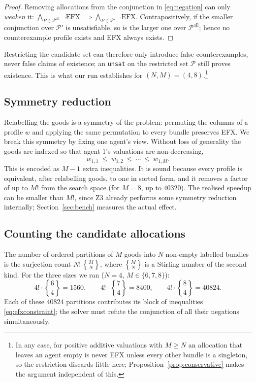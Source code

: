 \documentclass[11pt,a4paper]{article}
\theoremstyle{definition}
\theoremstyle{plain}
\newcommand{\EFX}{\textsf{EFX}}
\newcommand{\agents}{N}
\newcommand{\goods}{M}
\begin{document}
\begin{proof}
Removing allocations from the conjunction in \eqref{eq:negation} can only
\emph{weaken} it: $\bigwedge_{P\in\mathcal{P}^{\mathrm{all}}}\neg\mathrm{EFX}
\implies \bigwedge_{P\in\mathcal{P}'}\neg\mathrm{EFX}$. Contrapositively, if the
smaller conjunction over $\mathcal{P}'$ is unsatisfiable, so is the larger one
over $\mathcal{P}^{\mathrm{all}}$; hence no counterexample profile exists and
\EFX{} always exists.
\end{proof}

Restricting the candidate set can therefore only introduce false counterexamples,
never false claims of existence; an \texttt{unsat} on the restricted set
$\mathcal{P}$ still proves existence. This is what our run establishes for
$(\agents,\goods)=(4,8)$.\footnote{In any case, for positive additive valuations
with $\goods\geq\agents$ an allocation that leaves an agent empty is never \EFX{}
unless every other bundle is a singleton, so the restriction discards little here;
Proposition~\ref{prop:conservative} makes the argument independent of this.}

\subsection{Symmetry reduction}
\label{sec:symmetry}

Relabelling the goods is a symmetry of the problem: permuting the columns of a
profile $w$ and applying the same permutation to every bundle preserves \EFX. We
break this symmetry by fixing one agent's view. Without loss of generality the
goods are indexed so that agent $1$'s valuations are non-decreasing,
\[
  w_{1,1}\ \leq\ w_{1,2}\ \leq\ \cdots\ \leq\ w_{1,\goods}.
\]
This is encoded as $\goods-1$ extra inequalities. It is sound because every
profile is equivalent, after relabelling goods, to one in sorted form, and it
removes a factor of up to $\goods!$ from the search space (for $\goods=8$, up to
$40320$). The realised speedup can be smaller than $\goods!$, since Z3 already
performs some symmetry reduction internally; Section~\ref{sec:bench} measures the
actual effect.

\subsection{Counting the candidate allocations}

The number of ordered partitions of $\goods$ goods into $\agents$ non-empty
labelled bundles is the surjection count
$\agents!\,\genfrac{\{}{\}}{0pt}{}{\goods}{\agents}$, where
$\genfrac{\{}{\}}{0pt}{}{\goods}{\agents}$ is a Stirling number of the second
kind. For the three sizes we ran ($\agents=4$, $\goods\in\{6,7,8\}$):
\[
  4!\cdot\genfrac{\{}{\}}{0pt}{}{6}{4}=1560,\qquad
  4!\cdot\genfrac{\{}{\}}{0pt}{}{7}{4}=8400,\qquad
  4!\cdot\genfrac{\{}{\}}{0pt}{}{8}{4}=40824.
\]
Each of these $40824$ partitions contributes its block of inequalities
\eqref{eq:efxconstraint}; the solver must refute the conjunction of all their
negations simultaneously.
\end{document}
